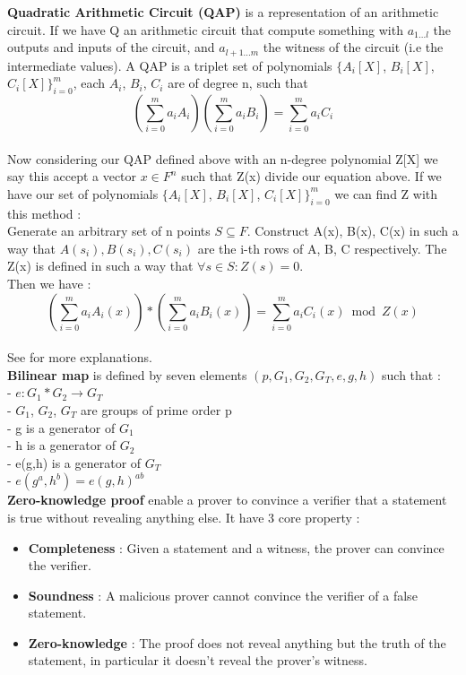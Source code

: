 \textbf{Quadratic Arithmetic Circuit (QAP)} is a representation of an arithmetic circuit. 
If we have Q an arithmetic circuit that compute something with $a_{1...l}$ the outputs and inputs of the circuit, and  $a_{l+1...m}$ the witness of the circuit (i.e the intermediate values). 
A QAP is a triplet set of polynomials $\{A_i[X]$, $B_i[X]$, $C_i[X]\}_{i=0}^m$, each $A_i$, $B_i$, $C_i$ are of degree n, such that \[ (\sum_{i=0}^m a_i A_i) (\sum_{i=0}^m a_i B_i) = \sum_{i=0}^m a_i C_i  \] 
\\ Now considering our QAP defined above with an n-degree polynomial Z[X] we say this accept a vector $x \in F^n$ such that Z(x) divide our equation above. If we have our set of polynomials $\{A_i[X]$, $B_i[X]$, $C_i[X]\}_{i=0}^m$ we can find Z with this method : 
\\ Generate an arbitrary set of n points $S \subseteq F$. Construct A(x), B(x), C(x) in such a way that $A(s_i ), B(s_i ), C(s_i )$ are the i-th rows of A, B, C respectively. The Z(x) is defined in such a way that
$\forall s \in S : Z(s) = 0$.
\\ Then we have : \[ (\sum_{i=0}^m a_i A_i(x)) * (\sum_{i=0}^m a_i B_i(x)) = \sum_{i=0}^m a_i C_i(x) \bmod Z(x) \] 
\\ See \cite{Succinct_Non_Interactive_Arguments_from_Quadratic_Arithmetic_Programs} for more explanations. \\

\textbf{Bilinear map} is defined by seven elements $(p, G_1, G_2, G_T, e, g, h)$ such that :
\\- $e:G_1*G_2\rightarrow G_T$
\\- $G_1$, $G_2$, $G_T$ are groups of prime order p
\\- g is a generator of $G_1$
\\- h is a generator of $G_2$
\\- e(g,h) is a generator of $G_T$
\\- $e(g^a, h^b) = e(g,h)^{ab}$ \\

\textbf{Zero-knowledge proof} enable a prover to convince a verifier that a statement is true without revealing anything else. It have 3 core property :
\begin{itemize}
  \item \textbf{Completeness} : Given a statement and a witness, the prover can convince the verifier.
  \item \textbf{Soundness} : A malicious prover cannot convince the verifier of a false statement.
  \item \textbf{Zero-knowledge} : The proof does not reveal anything but the truth of the statement, in particular it doesn't reveal the prover's witness.
\end{itemize}